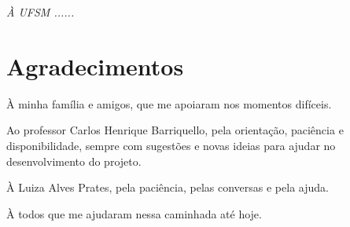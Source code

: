 \documentclass[tg]{mdtufsm}
\title{}
\author{Coletto}{Mikael Marin}
\institute{Centro de Tecnologia}
\date{10}{Dezembro}{2015}
\begin{document}
\maketitle

\restoregeometry


\makeapprove

\clearpage
\begin{flushright}
\mbox{}\vfill
{\sffamily\itshape À UFSM ......}
\end{flushright}

\chapter*{Agradecimentos}
\`A minha família e amigos, que me apoiaram nos momentos difíceis.

Ao professor Carlos Henrique Barriquello, pela orientação, paciência e disponibilidade, sempre com sugestões e novas ideias para ajudar no desenvolvimento do projeto.

\`A Luiza Alves Prates, pela paciência, pelas conversas e pela ajuda.

\`A todos que me ajudaram nessa caminhada até hoje.
\end{document}
